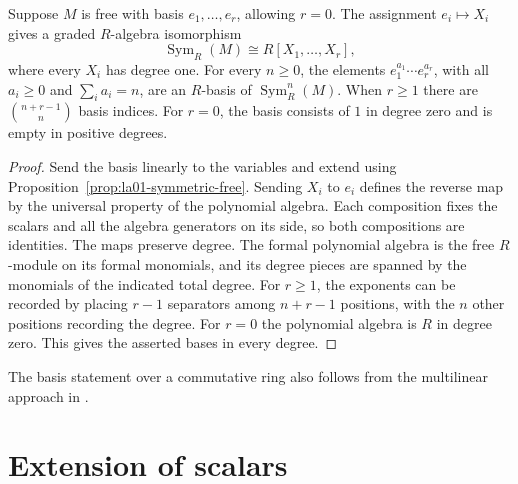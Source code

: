 \begin{theorem}
\label{thm:la01-symmetric-basis}
Suppose \(M\) is free with basis \(e_1,\ldots,e_r\), allowing \(r=0\).
The assignment \(e_i\mapsto X_i\) gives a graded \(R\)-algebra
isomorphism
\[
  \operatorname{Sym}_R(M)\cong R[X_1,\ldots,X_r],
\]
where every \(X_i\) has degree one. For every \(n\ge 0\), the
elements \(e_1^{a_1}\cdots e_r^{a_r}\), with all \(a_i\ge 0\) and
\(\sum_i a_i=n\), are an \(R\)-basis of \(\operatorname{Sym}^n_R(M)\).
When \(r\ge 1\) there are \(\binom{n+r-1}{n}\) basis indices. For
\(r=0\), the basis consists of \(1\) in degree zero and is empty
in positive degrees.
\end{theorem}
\begin{proof}
Send the basis linearly to the variables and extend using
Proposition~\ref{prop:la01-symmetric-free}. Sending \(X_i\) to \(e_i\)
defines the reverse map by the universal property of the polynomial
algebra. Each composition fixes the scalars and all the algebra
generators on its side, so both compositions are identities.
The maps preserve degree. The formal polynomial algebra is the free
\(R\)-module on its formal monomials, and its degree pieces are
spanned by the monomials of the indicated total degree. For \(r\ge 1\),
the exponents can be recorded by placing \(r-1\) separators among
\(n+r-1\) positions, with the \(n\) other positions recording the
degree. For \(r=0\) the polynomial algebra is \(R\) in degree zero.
This gives the asserted bases in every degree.
\end{proof}

The basis statement over a commutative ring also follows from the
multilinear approach in \cite[Theorem 1.2]{conrad-sym}.

\section{Extension of scalars}

